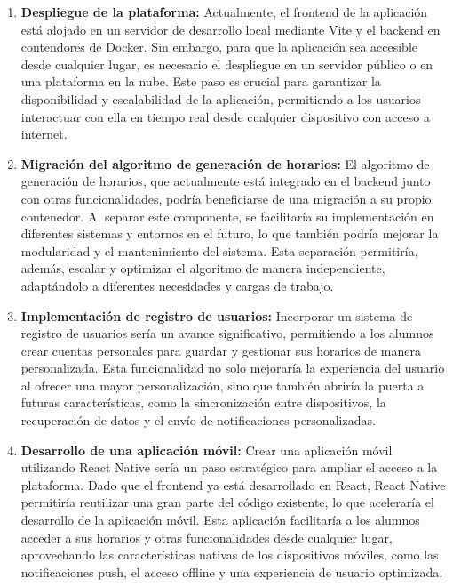 \begin{enumerate}
    \item \textbf{Despliegue de la plataforma:} Actualmente, el frontend de la aplicación está alojado en un servidor de desarrollo local mediante Vite y el backend en contendores de Docker. Sin embargo, para que la aplicación sea accesible desde cualquier lugar, es necesario el despliegue en un servidor público o en una plataforma en la nube. Este paso es crucial para garantizar la disponibilidad y escalabilidad de la aplicación, permitiendo a los usuarios interactuar con ella en tiempo real desde cualquier dispositivo con acceso a internet.
    
    \item \textbf{Migración del algoritmo de generación de horarios:} El algoritmo de generación de horarios, que actualmente está integrado en el backend junto con otras funcionalidades, podría beneficiarse de una migración a su propio contenedor. Al separar este componente, se facilitaría su implementación en diferentes sistemas y entornos en el futuro, lo que también podría mejorar la modularidad y el mantenimiento del sistema. Esta separación permitiría, además, escalar y optimizar el algoritmo de manera independiente, adaptándolo a diferentes necesidades y cargas de trabajo.

    \item \textbf{Implementación de registro de usuarios:} Incorporar un sistema de registro de usuarios sería un avance significativo, permitiendo a los alumnos crear cuentas personales para guardar y gestionar sus horarios de manera personalizada. Esta funcionalidad no solo mejoraría la experiencia del usuario al ofrecer una mayor personalización, sino que también abriría la puerta a futuras características, como la sincronización entre dispositivos, la recuperación de datos y el envío de notificaciones personalizadas.
    
    \item \textbf{Desarrollo de una aplicación móvil:} Crear una aplicación móvil utilizando React Native sería un paso estratégico para ampliar el acceso a la plataforma. Dado que el frontend ya está desarrollado en React, React Native permitiría reutilizar una gran parte del código existente, lo que aceleraría el desarrollo de la aplicación móvil. Esta aplicación facilitaría a los alumnos acceder a sus horarios y otras funcionalidades desde cualquier lugar, aprovechando las características nativas de los dispositivos móviles, como las notificaciones push, el acceso offline y una experiencia de usuario optimizada.
    

\end{enumerate}
